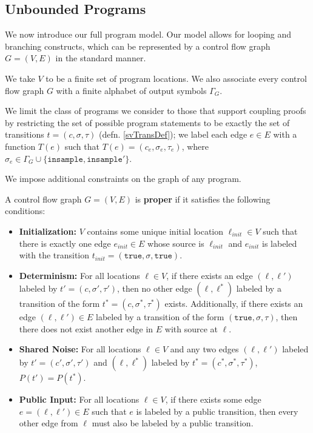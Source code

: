 
\subsection{Unbounded Programs}\label{svProgramsSection}

We now introduce our full program model. Our model allows for looping and branching constructs, which can be represented by a control flow graph $G = (V, E)$ in the standard manner. 

We take $V$ to be a finite set of program locations. We also associate every control flow graph $G$ with a finite alphabet of output symbols $\Gamma_G$.

We limit the class of programs we consider to those that support coupling proofs by restricting the set of possible program statements to be exactly the set of transitions $t = (c, \sigma, \tau)$ (defn. \ref{svTransDef}); we label each edge $e\in E$ with a function $T(e)$ such that $T(e) = (c_e, \sigma_e, \tau_e)$, where $\sigma_e \in \Gamma_G\cup\{\texttt{insample}, \texttt{insample}'\}$. 

We impose additional constraints on the graph of any program. 

\begin{defn}
    A control flow graph $G = (V, E)$ is \textbf{proper} if it satisfies the following conditions: 
    \begin{itemize}
        \item \textbf{Initialization:} $V$ contains some unique initial location $\ell_{init}\in V$ such that there is exactly one edge $e_{init}\in E$ whose source is $\ell_{init}$ and $e_{init}$ is labeled with the transition $t_{init} = (\texttt{true}, \sigma, \texttt{true})$.
        \item \textbf{Determinism:} For all locations $\ell\in V$, if there exists an edge $(\ell, \ell')$ labeled by $t'=(c, \sigma', \tau')$, then no other edge $(\ell, \ell^*)$ labeled by a transition of the form $t^* = (c, \sigma^*, \tau^*)$ exists. 
        Additionally, if there exists an edge $(\ell, \ell')\in E$ labeled by a transition of the form $(\texttt{true}, \sigma, \tau)$, then there does not exist another edge in $E$ with source at $\ell$.
        \item \textbf{Shared Noise:} For all locations $\ell\in V$ and any two edges $(\ell, \ell')$ labeled by $t'=(c', \sigma', \tau')$ and $(\ell, \ell^*)$ labeled by $t^* = (c^*, \sigma^*, \tau^*)$, $P(t') = P(t^*)$. 
        \item \textbf{Public Input:} For all locations $\ell\in V$, if there exists some edge $e = (\ell, \ell') \in E$ such that $e$ is labeled by a public transition, then every other edge from $\ell$ must also be labeled by a public transition. 
\end{itemize}
\end{defn}


